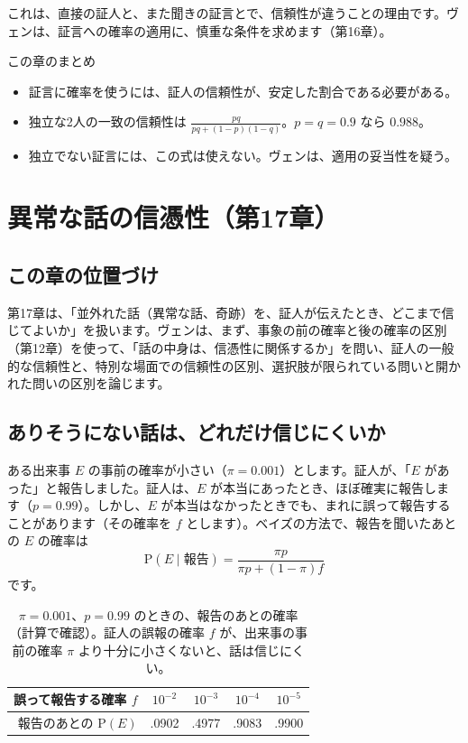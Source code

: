 \documentclass[a4paper,11pt,openany]{ltjsbook}
\newcommand{\Prob}{\mathrm{P}}
\begin{document}
これは、直接の証人と、また聞きの証言とで、信頼性が違うことの理由です。ヴェンは、証言への確率の適用に、慎重な条件を求めます（第16章）。

\begin{pointbox}{この章のまとめ}
\begin{itemize}[leftmargin=*]
\item 証言に確率を使うには、証人の信頼性が、安定した割合である必要がある。
\item 独立な2人の一致の信頼性は $\tfrac{pq}{pq+(1-p)(1-q)}$。$p=q=0.9$ なら $0.988$。
\item 独立でない証言には、この式は使えない。ヴェンは、適用の妥当性を疑う。
\end{itemize}
\end{pointbox}

\chapter{異常な話の信憑性（第17章）}

\section{この章の位置づけ}

第17章は、「並外れた話（異常な話、奇跡）を、証人が伝えたとき、どこまで信じてよいか」を扱います。ヴェンは、まず、事象の前の確率と後の確率の区別（第12章）を使って、「話の中身は、信憑性に関係するか」を問い、証人の一般的な信頼性と、特別な場面での信頼性の区別、選択肢が限られている問いと開かれた問いの区別を論じます。

\section{ありそうにない話は、どれだけ信じにくいか}

ある出来事 $E$ の事前の確率が小さい（$\pi=0.001$）とします。証人が、「$E$ があった」と報告しました。証人は、$E$ が本当にあったとき、ほぼ確実に報告します（$p=0.99$）。しかし、$E$ が本当はなかったときでも、まれに誤って報告することがあります（その確率を $f$ とします）。ベイズの方法で、報告を聞いたあとの $E$ の確率は
\[
\Prob(E\mid\text{報告})=\frac{\pi p}{\pi p+(1-\pi)f}
\]
です。

\begin{table}[htbp]
\centering
\begin{tabular}{r|cccc}
\toprule
誤って報告する確率 $f$ & $10^{-2}$ & $10^{-3}$ & $10^{-4}$ & $10^{-5}$\\
\midrule
報告のあとの $\Prob(E)$ & .0902 & .4977 & .9083 & .9900\\
\bottomrule
\end{tabular}
\caption{$\pi=0.001$、$p=0.99$ のときの、報告のあとの確率（計算で確認）。証人の誤報の確率 $f$ が、出来事の事前の確率 $\pi$ より十分に小さくないと、話は信じにくい。}
\end{table}
\end{document}
